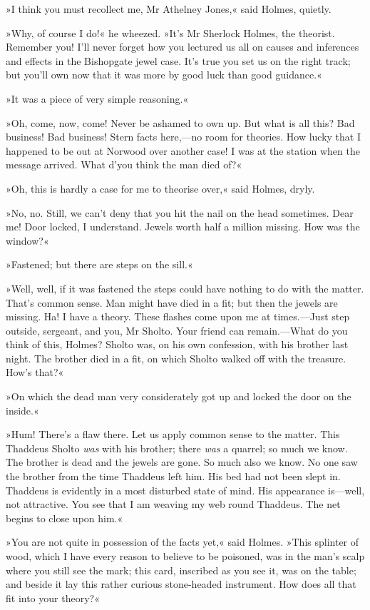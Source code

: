 »I think you must recollect me, Mr Athelney Jones,« said Holmes, quietly.

»Why, of course I do!« he wheezed. »It's Mr Sherlock Holmes, the theorist. Remember you! I'll never forget how you lectured us all on causes and inferences and effects in the Bishopgate jewel case. It's true you set us on the right track; but you'll own now that it was more by good luck than good guidance.«

»It was a piece of very simple reasoning.«

»Oh, come, now, come! Never be ashamed to own up. But what is all this? Bad business! Bad business! Stern facts here,—no room for theories. How lucky that I happened to be out at Norwood over another case! I was at the station when the message arrived. What d'you think the man died of?«

»Oh, this is hardly a case for me to theorise over,« said Holmes, dryly.

»No, no. Still, we can't deny that you hit the nail on the head sometimes. Dear me! Door locked, I understand. Jewels worth half a million missing. How was the window?«

»Fastened; but there are steps on the sill.«

»Well, well, if it was fastened the steps could have nothing to do with the matter. That's common sense. Man might have died in a fit; but then the jewels are missing. Ha! I have a theory. These flashes come upon me at times.—Just step outside, sergeant, and you, Mr Sholto. Your friend can remain.—What do you think of this, Holmes? Sholto was, on his own confession, with his brother last night. The brother died in a fit, on which Sholto walked off with the treasure. How's that?«

»On which the dead man very considerately got up and locked the door on the inside.«

»Hum! There's a flaw there. Let us apply common sense to the matter. This Thaddeus Sholto \textit{was} with his brother; there \textit{was} a quarrel; so much we know. The brother is dead and the jewels are gone. So much also we know. No one saw the brother from the time Thaddeus left him. His bed had not been slept in. Thaddeus is evidently in a most disturbed state of mind. His appearance is—well, not attractive. You see that I am weaving my web round Thaddeus. The net begins to close upon him.«

»You are not quite in possession of the facts yet,« said Holmes. »This splinter of wood, which I have every reason to believe to be poisoned, was in the man's scalp where you still see the mark; this card, inscribed as you see it, was on the table; and beside it lay this rather curious stone-headed instrument. How does all that fit into your theory?«

